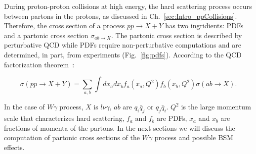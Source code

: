 During proton-proton collisions at high energy, the hard scattering process occurs between partons in the protons, as discussed in Ch.~\ref{sec:Intro_ppCollisions}. Therefore, the cross section of a process $pp \rightarrow X+Y$ has two ingridients: PDFs and a partonic cross section $\sigma_{ab\rightarrow X}$. The partonic cross section is described by perturbative QCD while PDFs require non-perturbative computations and are determined, in part, from experiments (Fig.~\ref{fig:pdfs}). According to the QCD factorization theorem~\cite{ref_HardScattering}:

\begin{equation}\label{eq:ppCS_general}
  \sigma(pp \rightarrow X+Y)= \sum_{a,b} \int dx_a dx_b f_a(x_a,Q^2) f_b(x_b, Q^2) \sigma(ab \rightarrow X).
\end{equation}

In the case of $W\gamma$ process, $X$ is $l \nu \gamma$, $ab$ are $q_i \bar{q}_j$ or $q_j \bar{q}_i$. $Q^2$ is the large momentum scale that characterizes hard scattering, $f_a$ and $f_b$ are PDFs, $x_a$ and $x_b$ are fractions of momenta of the partons. In the next sections we will discuss the computation of partonic cross sections of the $W\gamma$ process and possible BSM effects.

